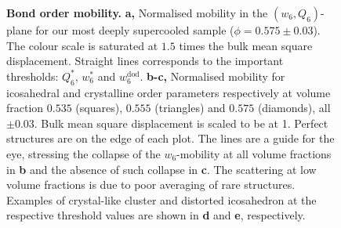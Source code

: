 \begin{figure}
	\caption{\textbf{Bond order mobility.} {\bf a,} Normalised mobility in the $(w_6, Q_6)$-plane for our most deeply supercooled sample ($\phi = 0.575 \pm 0.03$). The colour scale is saturated at $1.5$ times the bulk mean square displacement. Straight lines corresponds to the important thresholds: $Q_6^*$, $w_6^*$ and $w_6^\text{dod}$. {\bf b-c,} Normalised mobility for icosahedral and crystalline order parameters respectively at volume fraction $0.535$ (squares), $0.555$ (triangles) and $0.575$ (diamonds), all $\pm 0.03$. Bulk mean square displacement is scaled to be at 1. Perfect structures are on the edge of each plot. The lines are a guide for the eye, stressing the collapse of the $w_6$-mobility at all volume fractions in {\bf b} and the absence of such collapse in {\bf c}. The scattering at low volume fractions is due to poor averaging of rare structures. Examples of crystal-like cluster and distorted icosahedron at the respective threshold values are shown in \textbf{d} and \textbf{e}, respectively.}
	\label{fig:msd_Q6_w6}
\end{figure}
\tikzset{external/force remake=false}
